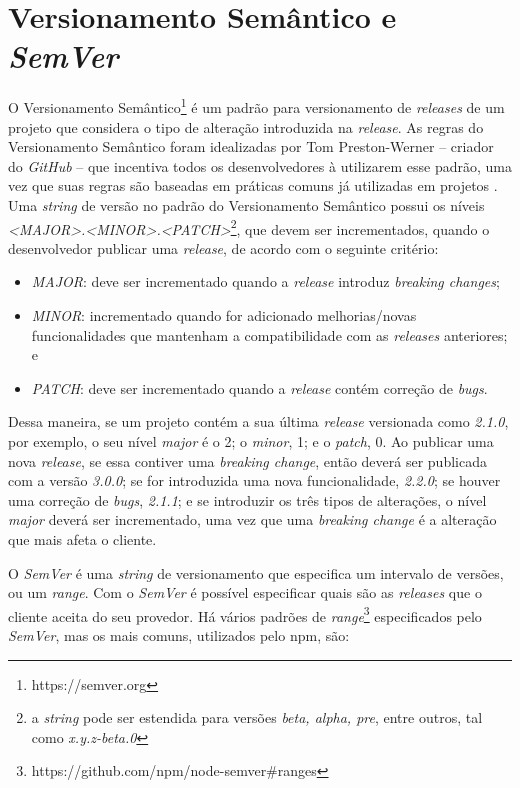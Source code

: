\section{Versionamento Semântico e \textit{SemVer}}
\label{ref-teo:semver}

O Versionamento Semântico\footnote{https://semver.org} é um padrão para versionamento de \textit{releases} de um projeto que considera o tipo de alteração introduzida na \textit{release}. As regras do Versionamento Semântico foram idealizadas por Tom Preston-Werner -- criador do \textit{GitHub} -- que incentiva todos os desenvolvedores à utilizarem esse padrão, uma vez que suas regras são baseadas em práticas comuns já utilizadas em projetos \cite{teorical_reference:semver}. Uma \textit{string} de versão no padrão do Versionamento Semântico possui os níveis \textit{<MAJOR>.<MINOR>.<PATCH>}\footnote{a \textit{string} pode ser estendida para versões \textit{beta, alpha, pre}, entre outros, tal como \textit{x.y.z-beta.0}}, que devem ser incrementados, quando o desenvolvedor publicar uma \textit{release}, de acordo com o seguinte critério:

\begin{itemize}
    \item \textit{MAJOR}: deve ser incrementado quando a \textit{release} introduz \textit{breaking changes};
    \item \textit{MINOR}: incrementado quando for adicionado melhorias/novas funcionalidades que mantenham a compatibilidade com as \textit{releases} anteriores; e
    \item \textit{PATCH}: deve ser incrementado quando a \textit{release} contém correção de \textit{bugs}.
\end{itemize}{}

Dessa maneira, se um projeto contém a sua última \textit{release} versionada como \textit{2.1.0}, por exemplo, o seu nível \textit{major} é o 2; o \textit{minor}, 1; e o \textit{patch}, 0. Ao publicar uma nova \textit{release}, se essa contiver uma \textit{breaking change}, então deverá ser publicada com a versão \textit{3.0.0}; se for introduzida uma nova funcionalidade, \textit{2.2.0}; se houver uma correção de \textit{bugs}, \textit{2.1.1}; e se introduzir os três tipos de alterações, o nível \textit{major} deverá ser incrementado, uma vez que uma \textit{breaking change} é a alteração que mais afeta o cliente.

O \textit{SemVer} é uma \textit{string} de versionamento que especifica um intervalo de versões, ou um \textit{range}. Com o \textit{SemVer} é possível especificar quais são as \textit{releases} que o cliente aceita do seu provedor. Há vários padrões de \textit{range}\footnote{https://github.com/npm/node-semver\#ranges} especificados pelo \textit{SemVer}, mas os mais comuns, utilizados pelo \gls{npm}, são:

